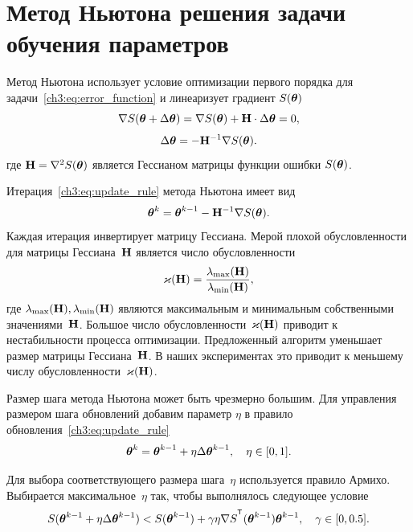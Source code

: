 \section{Метод Ньютона решения задачи обучения параметров}

Метод Ньютона использует условие оптимизации первого порядка для задачи~\eqref{ch3:eq:error_function} и линеаризует градиент $S (\boldsymbol{\theta})$
\[
\nabla S (\boldsymbol{\theta} + \Delta \boldsymbol{\theta}) = \nabla S(\boldsymbol{\theta}) + \mathbf{H} \cdot \Delta \boldsymbol{\theta} = 0,
\]
\[
\Delta \boldsymbol{\theta} = - \mathbf{H}^{-1} \nabla S(\boldsymbol{\theta}).
\]
где $\mathbf{H} = \nabla^2 S(\boldsymbol{\theta})$ является Гессианом матрицы функции ошибки $S(\boldsymbol{\theta})$.

Итерация~\eqref{ch3:eq:update_rule} метода Ньютона имеет вид
\[
\boldsymbol{\theta}^k = \boldsymbol{\theta}^{k-1} - \mathbf{H}^{-1} \nabla S(\boldsymbol{\theta}).
\]
Каждая итерация инвертирует матрицу Гессиана.
Мерой плохой обусловленности для матрицы Гессиана~$\mathbf{H}$ является число обусловленности
\[
\varkappa(\mathbf{H}) = \frac{\lambda_{\text{max}}(\mathbf{H})}{\lambda_{\text{min}}(\mathbf{H})},
\]
где $\lambda_{\text{max}}(\mathbf{H}), \lambda_{\text{min}}(\mathbf{H})$ являются максимальным и минимальным собственными значениями~$\mathbf{H}$. Большое число обусловленности~$\varkappa (\mathbf{H})$ приводит к нестабильности процесса оптимизации.
Предложенный алгоритм уменьшает размер матрицы Гессиана~$\mathbf{H}$. В наших экспериментах это приводит к меньшему числу обусловленности~$\varkappa (\mathbf{H})$.

Размер шага метода Ньютона может быть чрезмерно большим. Для управления размером шага обновлений добавим параметр $\eta$ в правило обновления~\eqref{ch3:eq:update_rule}
\[
\boldsymbol{\theta}^k = \boldsymbol{\theta}^{k - 1} + \eta \Delta \boldsymbol{\theta}^{k - 1}, \quad \eta \in [0, 1].
\]

Для выбора соответствующего размера шага~$\eta$ используется правило Армихо. Выбирается максимальное~$\eta$ так, чтобы выполнялось следующее условие
\[
S(\btheta^{k - 1} + \eta \Delta \btheta^{k - 1}) < S(\btheta^{k - 1}) + \gamma \eta \nabla S^{\T}(\btheta^{k-1})\btheta^{k - 1}, \quad \gamma \in [0, 0.5].
\]

